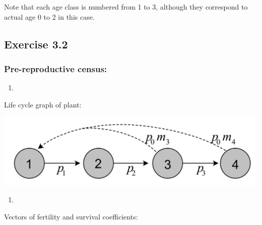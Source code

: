 \documentclass[
]{book}
\newenvironment{Shaded}{\begin{snugshade}}{\end{snugshade}}
\newcommand{\DecValTok}[1]{\textcolor[rgb]{0.00,0.00,0.81}{#1}}
\newcommand{\NormalTok}[1]{#1}
\newcommand{\OtherTok}[1]{\textcolor[rgb]{0.56,0.35,0.01}{#1}}
\newcommand{\SpecialCharTok}[1]{\textcolor[rgb]{0.00,0.00,0.00}{#1}}
\providecommand{\tightlist}{%
  \setlength{\itemsep}{0pt}\setlength{\parskip}{0pt}}
\begin{document}
Note that each age class is numbered from 1 to 3, although they correspond to actual age 0 to 2 in this case.

\hypertarget{exercise-3.2-1}{%
\subsection*{Exercise 3.2}\label{exercise-3.2-1}}

\hypertarget{pre-reproductive-census-1}{%
\subsubsection*{Pre-reproductive census:}\label{pre-reproductive-census-1}}

\begin{enumerate}
\def\labelenumi{\arabic{enumi}.}
\tightlist
\item
\end{enumerate}

Life cycle graph of plant:

\includegraphics[width=0.6\linewidth]{LifeCyclePlantPRE}

\begin{enumerate}
\def\labelenumi{\arabic{enumi}.}
\setcounter{enumi}{1}
\tightlist
\item
\end{enumerate}

Vectors of fertility and survival coefficients:

\begin{Shaded}
\end{Shaded}
\end{document}
